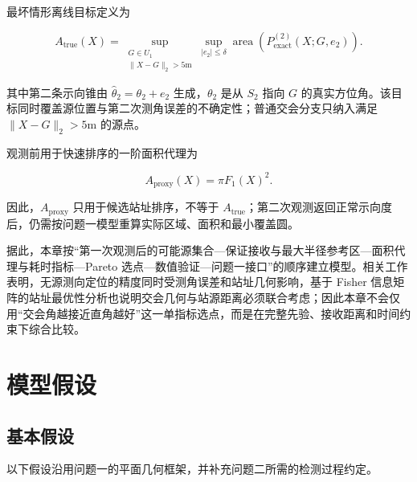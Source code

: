 最坏情形离线目标定义为

\[
A_{\mathrm{true}}(X)
=
\sup_{\substack{G\in U_1\\
\lVert X-G\rVert_2>5\mathrm{m}}}
\sup_{|e_2|\le\delta}
\operatorname{area}\left(P_{\mathrm{exact}}^{(2)}(X;G,e_2)\right).
\]

其中第二条示向锥由 $\hat\theta_2=\theta_2+e_2$ 生成，$\theta_2$ 是从 $S_2$ 指向 $G$ 的真实方位角。该目标同时覆盖源位置与第二次测角误差的不确定性；普通交会分支只纳入满足 $\lVert X-G\rVert_2>5\mathrm{m}$ 的源点。

观测前用于快速排序的一阶面积代理为

\[
A_{\mathrm{proxy}}(X)=\pi F_1(X)^2.
\]

因此，$A_{\mathrm{proxy}}$ 只用于候选站址排序，不等于 $A_{\mathrm{true}}$；第二次观测返回正常示向度后，仍需按问题一模型重算实际区域、面积和最小覆盖圆。

据此，本章按“第一次观测后的可能源集合—保证接收与最大半径参考区—面积代理与耗时指标—Pareto 选点—数值验证—问题一接口”的顺序建立模型。相关工作表明，无源测向定位的精度同时受测角误差和站址几何影响\cite{wang2019,zheng2014,uav2019}，基于 Fisher 信息矩阵的站址最优性分析也说明交会几何与站源距离必须联合考虑\cite{dogancay2005,bishop2010}；因此本章不会仅用“交会角越接近直角越好”这一单指标选点，而是在完整先验、接收距离和时间约束下综合比较。

\section{模型假设}

\subsection{基本假设}

以下假设沿用问题一的平面几何框架，并补充问题二所需的检测过程约定。


